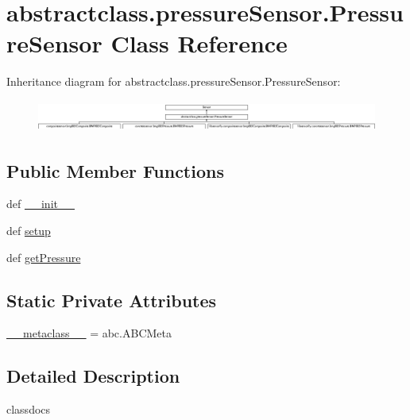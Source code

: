 \hypertarget{classabstractclass_1_1pressureSensor_1_1PressureSensor}{}\section{abstractclass.\+pressure\+Sensor.\+Pressure\+Sensor Class Reference}
\label{classabstractclass_1_1pressureSensor_1_1PressureSensor}
Inheritance diagram for abstractclass.\+pressure\+Sensor.\+Pressure\+Sensor\+:\begin{figure}[H]
\begin{center}
\leavevmode
\includegraphics[height=1.050000cm]{classabstractclass_1_1pressureSensor_1_1PressureSensor}
\end{center}
\end{figure}
\subsection*{Public Member Functions}
\begin{DoxyCompactItemize}
\item 
def \hyperlink{classabstractclass_1_1pressureSensor_1_1PressureSensor_a8e2d9b172b89b2cd3ce16434440e699a}{\+\_\+\+\_\+init\+\_\+\+\_\+}
\item 
def \hyperlink{classabstractclass_1_1pressureSensor_1_1PressureSensor_a0e72f85be58717fb5da1781344487943}{setup}
\item 
def \hyperlink{classabstractclass_1_1pressureSensor_1_1PressureSensor_a14cd8ffdab17fa115b24c7196a218585}{get\+Pressure}
\end{DoxyCompactItemize}
\subsection*{Static Private Attributes}
\begin{DoxyCompactItemize}
\item 
\hyperlink{classabstractclass_1_1pressureSensor_1_1PressureSensor_a1d689bbb56e5a04ae9d1d100ac0bab3f}{\+\_\+\+\_\+metaclass\+\_\+\+\_\+} = abc.\+A\+B\+C\+Meta
\end{DoxyCompactItemize}


\subsection{Detailed Description}
\begin{DoxyVerb}classdocs
\end{DoxyVerb}
 

